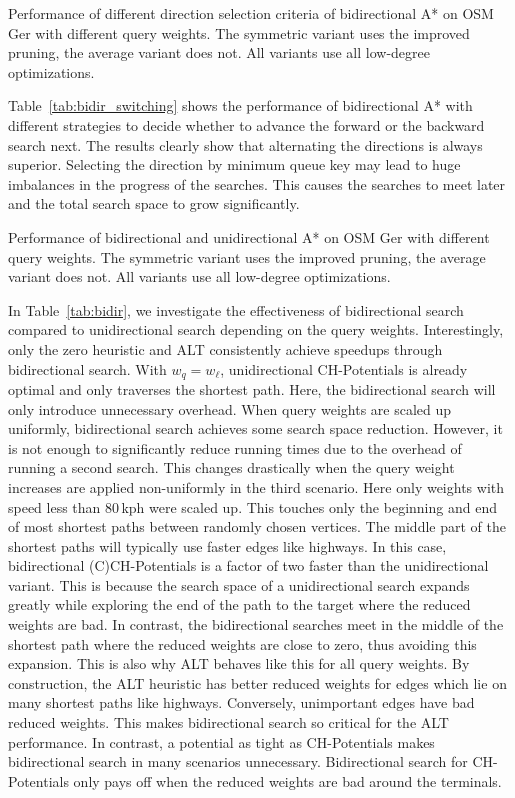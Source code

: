 \documentclass[manuscript,review]{acmart}
\begin{document}
\begin{table}
\centering
\caption{
Performance of different direction selection criteria of bidirectional A* on OSM Ger with different query weights.
The symmetric variant uses the improved pruning, the average variant does not.
All variants use all low-degree optimizations.
}\label{tab:bidir_switching}

\end{table}

Table~\ref{tab:bidir_switching} shows the performance of bidirectional A* with different strategies to decide whether to advance the forward or the backward search next.
The results clearly show that alternating the directions is always superior.
Selecting the direction by minimum queue key may lead to huge imbalances in the progress of the searches.
This causes the searches to meet later and the total search space to grow significantly.

\begin{table}
\centering
\caption{
Performance of bidirectional and unidirectional A* on OSM Ger with different query weights.
The symmetric variant uses the improved pruning, the average variant does not.
All variants use all low-degree optimizations.
}\label{tab:bidir}

\end{table}

In Table~\ref{tab:bidir}, we investigate the effectiveness of bidirectional search compared to unidirectional search depending on the query weights.
Interestingly, only the zero heuristic and ALT consistently achieve speedups through bidirectional search.
With $w_q = w_{\ell}$, unidirectional CH-Potentials is already optimal and only traverses the shortest path.
Here, the bidirectional search will only introduce unnecessary overhead.
When query weights are scaled up uniformly, bidirectional search achieves some search space reduction.
However, it is not enough to significantly reduce running times due to the overhead of running a second search.
This changes drastically when the query weight increases are applied non-uniformly in the third scenario.
Here only weights with speed less than 80\,kph were scaled up.
This touches only the beginning and end of most shortest paths between randomly chosen vertices.
The middle part of the shortest paths will typically use faster edges like highways.
In this case, bidirectional (C)CH-Potentials is a factor of two faster than the unidirectional variant.
This is because the search space of a unidirectional search expands greatly while exploring the end of the path to the target where the reduced weights are bad.
In contrast, the bidirectional searches meet in the middle of the shortest path where the reduced weights are close to zero, thus avoiding this expansion.
This is also why ALT behaves like this for all query weights.
By construction, the ALT heuristic has better reduced weights for edges which lie on many shortest paths like highways.
Conversely, unimportant edges have bad reduced weights.
This makes bidirectional search so critical for the ALT performance.
In contrast, a potential as tight as CH-Potentials makes bidirectional search in many scenarios unnecessary.
Bidirectional search for CH-Potentials only pays off when the reduced weights are bad around the terminals.
\end{document}

